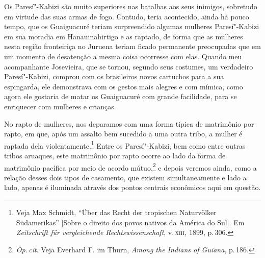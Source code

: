 Os Paresí"-Kabizi são muito superiores nas batalhas aos seus inimigos, sobretudo em virtude
das suas armas de fogo. Contudo, teria acontecido, ainda há pouco
tempo, que os Guaiguacuré teriam surpreendido algumas mulheres Paresí"-Kabizi
em sua moradia em Hanauinahirtigo e as raptado, de forma que as
mulheres nesta região fronteiriça no Juruena teriam ficado permanente
preocupadas que em um momento de desatenção a mesma coisa ocorresse com
elas. Quando meu acompanhante Josevieira, que se tornou, segundo seus
costumes, um verdadeiro Paresí"-Kabizi, comprou com os brasileiros novos
cartuchos para a sua espingarda, ele demonstrava com os gestos mais
alegres e com mímica, como agora ele gostaria de matar os Guaiguacuré
com grande facilidade, para se enriquecer com mulheres e crianças.

{No rapto de mulheres, nos deparamos com uma forma típica de matrimônio
por rapto, em que, após um assalto bem sucedido a uma outra tribo, a
mulher é raptada dela violentamente.\footnote{Veja Max Schmidt, ``Über
  das Recht der tropischen Naturvölker Südamerikas'' {[}Sobre o direito
  dos povos nativos da América do Sul{]}. Em \textit{Zeitschrift für
  vergleichende Rechtswissenschaft}, v.\,\textsc{xiii}, 1899, p.\,306.} Entre os
Paresí"-Kabizi, bem como entre outras tribos aruaques, este matrimônio por
rapto ocorre ao lado da forma de matrimônio pacífica por meio de acordo
mútuo,\footnote{\textit{Op.\,cit}. Veja Everhard F. im Thurn, \textit{Among the
  Indians of Guiana}, p.\,186.} e depois veremos ainda, como a relação
desses dois tipos de casamento, que existem simultaneamente e lado a
lado, apenas é iluminada através dos pontos centrais econômicos aqui em
questão.}


